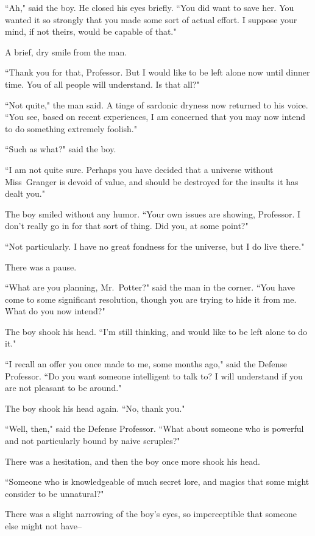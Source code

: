``Ah," said the boy. He closed his eyes briefly. ``You did want to save her. You wanted it so strongly that you made some sort of actual effort. I suppose your mind, if not theirs, would be capable of that."

A brief, dry smile from the man.

``Thank you for that, Professor. But I would like to be left alone now until dinner time. You of all people will understand. Is that all?"

``Not quite," the man said. A tinge of sardonic dryness now returned to his voice. ``You see, based on recent experiences, I am concerned that you may now intend to do something extremely foolish."

``Such as what?" said the boy.

``I am not quite sure. Perhaps you have decided that a universe without Miss~Granger is devoid of value, and should be destroyed for the insults it has dealt you."

The boy smiled without any humor. ``Your own issues are showing, Professor. I don't really go in for that sort of thing. Did you, at some point?"

``Not particularly. I have no great fondness for the universe, but I do live there."

There was a pause.

``What are you planning, Mr.~Potter?" said the man in the corner. ``You have come to some significant resolution, though you are trying to hide it from me. What do you now intend?"

The boy shook his head. ``I'm still thinking, and would like to be left alone to do it."

``I recall an offer you once made to me, some months ago," said the Defense Professor. ``Do you want someone intelligent to talk to? I will understand if you are not pleasant to be around."

The boy shook his head again. ``No, thank you."

``Well, then," said the Defense Professor. ``What about someone who is powerful and not particularly bound by naive scruples?"

There was a hesitation, and then the boy once more shook his head.

``Someone who is knowledgeable of much secret lore, and magics that some might consider to be unnatural?"

There was a slight narrowing of the boy's eyes, so imperceptible that someone else might not have\---

